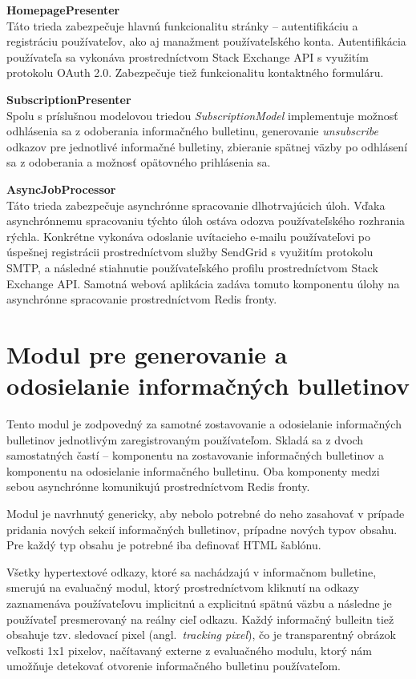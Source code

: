 \textbf{HomepagePresenter}\\
Táto trieda zabezpečuje hlavnú funkcionalitu stránky -- autentifikáciu a registráciu používateľov, ako aj manažment
používateľského konta. Autentifikácia používateľa sa vykonáva prostredníctvom Stack Exchange API s využitím protokolu OAuth 2.0.
Zabezpečuje tiež funkcionalitu kontaktného formuláru.

\textbf{SubscriptionPresenter}\\
Spolu s príslušnou modelovou triedou \textit{SubscriptionModel} implementuje možnosť odhlásenia sa z odoberania
informačného bulletinu, generovanie \textit{unsubscribe} odkazov pre jednotlivé informačné bulletiny, zbieranie spätnej
väzby po odhlásení sa z odoberania a možnosť opätovného prihlásenia sa.

\textbf{AsyncJobProcessor}\\
Táto trieda zabezpečuje asynchrónne spracovanie dlhotrvajúcich úloh. Vďaka asynchrónnemu spracovaniu týchto úloh ostáva
odozva používateľského rozhrania rýchla. Konkrétne vykonáva odoslanie uvítacieho e-mailu používateľovi po úspešnej
registrácii prostredníctvom služby SendGrid s využitím protokolu SMTP, a následné stiahnutie používateľského profilu
prostredníctvom Stack Exchange API.
Samotná webová aplikácia zadáva tomuto komponentu úlohy na asynchrónne spracovanie prostredníctvom Redis fronty.


\section{Modul pre generovanie a odosielanie informačných bulletinov}

Tento modul je zodpovedný za samotné zostavovanie a odosielanie informačných bulletinov jednotlivým zaregistrovaným
používateľom. Skladá sa z dvoch samostatných častí -- komponentu na zostavovanie informačných bulletinov a komponentu
na odosielanie informačného bulletinu. Oba komponenty medzi sebou asynchrónne komunikujú prostredníctvom Redis fronty.

Modul je navrhnutý genericky, aby nebolo potrebné do neho zasahovať v prípade pridania nových sekcií informačných bulletinov,
prípadne nových typov obsahu. Pre každý typ obsahu je potrebné iba definovať HTML šablónu.

Všetky hypertextové odkazy, ktoré sa nachádzajú v informačnom bulletine, smerujú na evaluačný modul, ktorý prostredníctvom
kliknutí na odkazy zaznamenáva používateľovu implicitnú a explicitnú spätnú väzbu a následne je používateľ presmerovaný
na reálny cieľ odkazu. Každý informačný bulleitn tiež obsahuje tzv. sledovací pixel (angl.~\textit{tracking pixel}), čo je
transparentný obrázok veľkosti 1x1 pixelov, načítavaný externe z evaluačného modulu, ktorý nám umožňuje detekovať otvorenie informačného
bulletinu používateľom.

